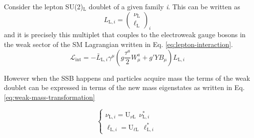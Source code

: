 Consider the lepton SU(2)$_\text{L}$ doublet of a given family \textit{i}. This can be written as 
\begin{equation}
    \label{eq:weak-lepton-doublet}
    L_{\text{L}, i} = \begin{pmatrix}
                            \nu_{\text{L}} \\
                            \ell_{\text{L}}
                            \end{pmatrix}_i
\end{equation}
and it is precisely this multiplet that couples to the electroweak gauge bosons in the weak sector of the \ac{SM} Lagrangian written in Eq. \ref{eq:lepton-interaction}.
\begin{equation}
    \label{eq:lepton-interaction}
    \mathcal{L}_{\text{int}} = - \bar{L}_{\text{L}, i} \gamma^\mu \left( g \frac{\tau^a}{2} W_\mu^a + g' Y B_\mu \right) L_{\text{L}, i}
\end{equation}

However when the \ac{SSB} happens and particles acquire mass the terms of the weak doublet can be expressed in terms 
of the new mass eigenstates as written in Eq. \ref{eq:weak-mass-transformation}

\begin{equation}
    \label{eq:weak-mass-transformation}
    \begin{cases}
        \nu_{\text{L}, i} = \text{U}_{\nu \text{L}}~~\nu_{\text{L}, i}^* \\
        \ell_{\text{L}, i} = \text{U}_{\ell \text{L}}~~\ell_{\text{L}, i}^* 
    \end{cases}
\end{equation}

